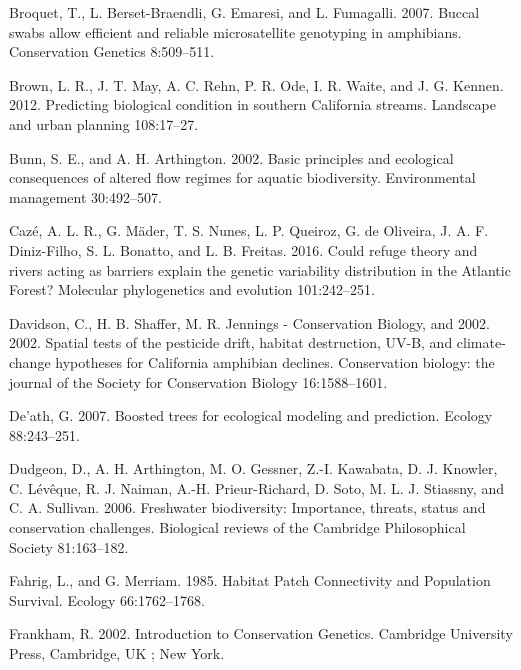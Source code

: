 \documentclass[twoside,12pt,final]{ucthesis-CA2012} %
\begin{document}
\begin{ucmainmatter}
\leavevmode\hypertarget{ref-broquet_buccal_2007}{}%
Broquet, T., L. Berset-Braendli, G. Emaresi, and L. Fumagalli. 2007.
Buccal swabs allow efficient and reliable microsatellite genotyping in
amphibians. Conservation Genetics 8:509--511.

\leavevmode\hypertarget{ref-brown_predicting_2012}{}%
Brown, L. R., J. T. May, A. C. Rehn, P. R. Ode, I. R. Waite, and J. G.
Kennen. 2012. Predicting biological condition in southern California
streams. Landscape and urban planning 108:17--27.

\leavevmode\hypertarget{ref-bunn_basic_2002}{}%
Bunn, S. E., and A. H. Arthington. 2002. Basic principles and ecological
consequences of altered flow regimes for aquatic biodiversity.
Environmental management 30:492--507.

\leavevmode\hypertarget{ref-caze_could_2016}{}%
Cazé, A. L. R., G. Mäder, T. S. Nunes, L. P. Queiroz, G. de Oliveira, J.
A. F. Diniz-Filho, S. L. Bonatto, and L. B. Freitas. 2016. Could refuge
theory and rivers acting as barriers explain the genetic variability
distribution in the Atlantic Forest? Molecular phylogenetics and
evolution 101:242--251.

\leavevmode\hypertarget{ref-davidson_spatial_2002}{}%
Davidson, C., H. B. Shaffer, M. R. Jennings - Conservation Biology, and
2002. 2002. Spatial tests of the pesticide drift, habitat destruction,
UV-B, and climate-change hypotheses for California amphibian declines.
Conservation biology: the journal of the Society for Conservation
Biology 16:1588--1601.

\leavevmode\hypertarget{ref-death_boosted_2007}{}%
De'ath, G. 2007. Boosted trees for ecological modeling and prediction.
Ecology 88:243--251.

\leavevmode\hypertarget{ref-dudgeon_freshwater_2006}{}%
Dudgeon, D., A. H. Arthington, M. O. Gessner, Z.-I. Kawabata, D. J.
Knowler, C. Lévêque, R. J. Naiman, A.-H. Prieur-Richard, D. Soto, M. L.
J. Stiassny, and C. A. Sullivan. 2006. Freshwater biodiversity:
Importance, threats, status and conservation challenges. Biological
reviews of the Cambridge Philosophical Society 81:163--182.

\leavevmode\hypertarget{ref-fahrig_habitat_1985}{}%
Fahrig, L., and G. Merriam. 1985. Habitat Patch Connectivity and
Population Survival. Ecology 66:1762--1768.

\leavevmode\hypertarget{ref-frankham_introduction_2002}{}%
Frankham, R. 2002. Introduction to Conservation Genetics. Cambridge
University Press, Cambridge, UK ; New York.


\end{ucmainmatter}
\end{document}
